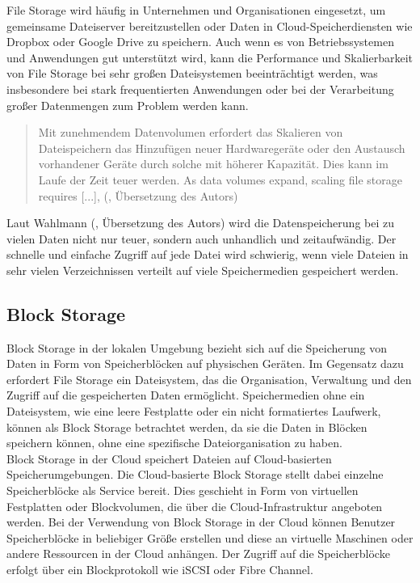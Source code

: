 File Storage wird häufig in Unternehmen und Organisationen eingesetzt, um gemeinsame Dateiserver bereitzustellen oder Daten in Cloud-Speicherdiensten wie Dropbox oder Google Drive zu speichern.
Auch wenn es von Betriebssystemen und Anwendungen gut unterstützt wird, kann die Performance und Skalierbarkeit von File Storage bei sehr großen Dateisystemen beeinträchtigt werden, was insbesondere bei stark frequentierten Anwendungen oder bei der Verarbeitung großer Datenmengen zum Problem werden kann. 

\newpage

\begin{quote}
	Mit zunehmendem Datenvolumen erfordert das Skalieren von Dateispeichern das Hinzufügen neuer Hardwaregeräte oder den Austausch vorhandener Geräte durch solche mit höherer Kapazität. Dies kann im Laufe der Zeit teuer werden. \glqq As data volumes expand, scaling file storage requires [...]\grqq, (\cite{nx-fileScala}, Übersetzung des Autors)
\end{quote}

Laut Wahlmann (\citeyear{nx-fileScala}, Übersetzung des Autors) wird die Datenspeicherung bei zu vielen Daten nicht nur teuer, sondern auch unhandlich und zeitaufwändig. Der schnelle und einfache Zugriff auf jede Datei wird schwierig, wenn viele Dateien in sehr vielen Verzeichnissen verteilt auf viele Speichermedien gespeichert werden. 

\newpage

\subsection{Block Storage}

Block Storage in der lokalen Umgebung bezieht sich auf die Speicherung von Daten in Form von Speicherblöcken auf physischen Geräten. Im Gegensatz dazu erfordert File Storage ein Dateisystem, das die Organisation, Verwaltung und den Zugriff auf die gespeicherten Daten ermöglicht. Speichermedien ohne ein Dateisystem, wie eine leere Festplatte oder ein nicht formatiertes Laufwerk, können als Block Storage betrachtet werden, da sie die Daten in Blöcken speichern können, ohne eine spezifische Dateiorganisation zu haben.\\

Block Storage in der Cloud speichert Dateien auf Cloud-basierten Speicherumgebungen. Die Cloud-basierte Block Storage stellt dabei einzelne Speicherblöcke als Service bereit. Dies geschieht in Form von virtuellen Festplatten oder Blockvolumen, die über die Cloud-Infrastruktur angeboten werden. Bei der Verwendung von Block Storage in der Cloud können Benutzer Speicherblöcke in beliebiger Größe erstellen und diese an virtuelle Maschinen oder andere Ressourcen in der Cloud anhängen. Der Zugriff auf die Speicherblöcke erfolgt über ein Blockprotokoll wie iSCSI oder Fibre Channel.\\

